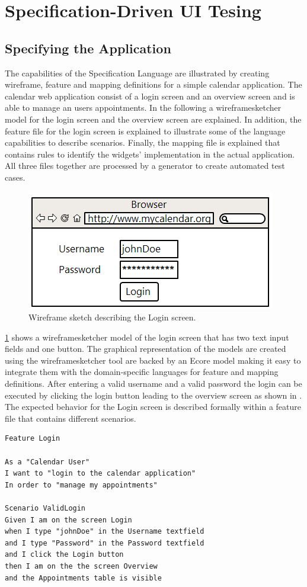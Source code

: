 \documentclass{sig-alternate-05-2015}
\begin{document}
\section{Specification-Driven UI Tesing}\label{sec:SpecificationDrivenUITesting}
\subsection{Specifying the Application}\label{sec:SpecifyingTheApplication} 
The capabilities of the Specification Language are illustrated by creating wireframe, feature and mapping definitions for a simple calendar application.
The calendar web application consist of a login screen and an overview screen and is able to manage an users appointments. 
In the following a wireframesketcher model for the login screen and the overview screen are explained.
In addition, the feature file for the login screen is explained to illustrate some of the language capabilities to describe scenarios.
Finally, the mapping file is explained that contains rules to identify the widgets' implementation in the actual application.
All three files together are processed by a generator to create automated test cases.
\begin{figure}[h]
	\centering
	\includegraphics[width=0.8\linewidth]{Login.png}
	\caption{Wireframe sketch describing the Login screen.}
	\label{fig:login}
\end{figure}

\cref{fig:login} shows a wireframesketcher model of the login screen that has two text input fields and one button.
The graphical representation of the models are created using the wireframesketcher tool are backed by an Ecore model making it easy to integrate them with the domain-specific languages for feature and mapping definitions.
After entering a valid username and a valid password the login can be executed by clicking the login button leading to the overview screen as shown in .
The expected behavior for the Login screen is described formally within a feature file that contains different scenarios.
\begin{lstlisting}[captionpos=b, caption=Feature Description: Login Screen., label={lst:featureLogin}, language=dsl]
Feature Login

As a "Calendar User"
I want to "login to the calendar application"
In order to "manage my appointments"

Scenario ValidLogin
Given I am on the screen Login 
when I type "johnDoe" in the Username textfield 
and I type "Password" in the Password textfield 
and I click the Login button
then I am on the the screen Overview 
and the Appointments table is visible
\end{lstlisting}
\end{document}

